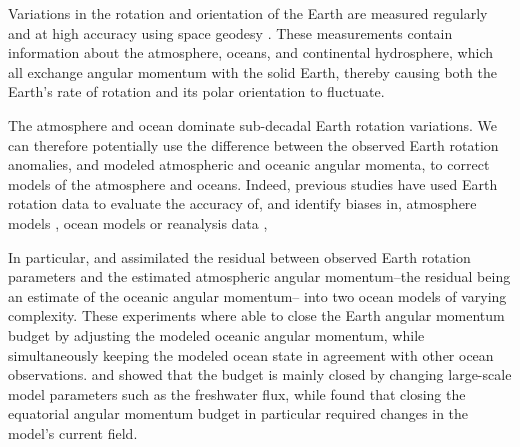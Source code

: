 
Variations in the rotation and orientation of the Earth are measured regularly and at high accuracy using space geodesy \citep{Gross1992,iers}. 
These measurements contain information about the atmosphere, oceans, and continental hydrosphere, which all exchange angular momentum with the solid Earth, thereby causing both the Earth's rate of rotation and its polar orientation to fluctuate. 

The atmosphere and ocean dominate sub-decadal Earth rotation variations. 
We can therefore potentially use the difference between the observed Earth rotation anomalies, and modeled atmospheric and oceanic angular momenta, to correct models of the atmosphere and oceans. 
Indeed, previous studies have used Earth rotation data to evaluate the accuracy of, 
and identify biases in, atmosphere models \citep{Boer1990, Rosen2000}, ocean 
models \citep{Gross1996a} or reanalysis data \citep{Yu1999, Aoyama2000, 
Paek2012a},

In particular, \citet{Saynisch2010,Saynisch2011} and \citet{Saynisch2012} assimilated the residual between observed Earth rotation parameters and the estimated atmospheric angular momentum--the residual being an estimate of the oceanic angular momentum-- into two ocean models of varying complexity. 
These experiments where able to close the Earth angular momentum budget by adjusting the modeled oceanic angular momentum, while simultaneously keeping the modeled ocean state in agreement with other ocean observations.  
\citet{Saynisch2010} and \citet{Saynisch2012} showed that the budget is mainly closed by changing large-scale model parameters such as the freshwater flux, while \citet{Saynisch2011} found that closing the equatorial angular momentum budget in particular required changes in the model's current field. 

